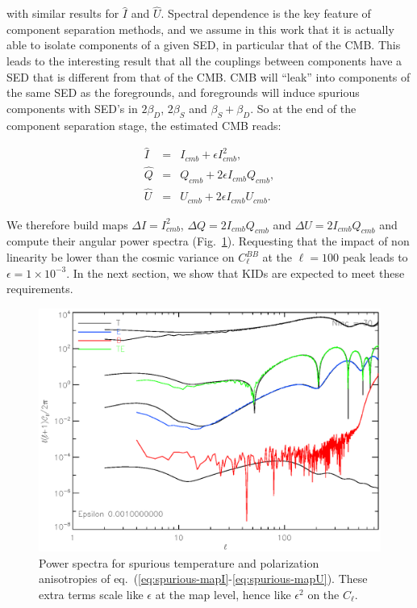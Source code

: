 \noindent with similar results for $\hat{I}$ and $\hat{U}$. Spectral dependence is the key
feature of component separation methods, and we assume in this work that it is
actually able to isolate components of a given SED, in particular that of the
CMB. This leads to the interesting result that all the couplings between
components have a SED that is different from that of the CMB. CMB will ``leak''
into components of the same SED as the foregrounds, and foregrounds will induce
spurious components with SED's in $2\beta_D$, $2\beta_S$ and
$\beta_S+\beta_D$. So at the end of the component separation stage, the
estimated CMB reads:

\begin{eqnarray}
\hat{I} &=& I_{cmb} +  \epsilon I_{cmb}^2, \label{eq:spurious-mapI}\\
\hat{Q} &=& Q_{cmb} + 2\epsilon I_{cmb}Q_{cmb}, \label{eq:spurious-mapQ}\\
\hat{U} &=& U_{cmb} + 2\epsilon I_{cmb}U_{cmb} \label{eq:spurious-mapU}.
\end{eqnarray}

We therefore build maps $\Delta I = I_{cmb}^2$, $\Delta Q = 2I_{cmb}Q_{cmb}$ and
$\Delta U = 2I_{cmb}Q_{cmb}$ and compute their angular power spectra
(Fig.~\ref{fig:fg_nl_residuals}). Requesting that the impact of non linearity be
lower than the cosmic variance on $C^{BB}_\ell$ at the $\ell=100$ peak leads to
$\epsilon = 1\times 10^{-3}$. In the next section, we show that KIDs are expected
to meet these requirements.



\begin{figure}
\center
\includegraphics[clip,angle=0,width=\columnwidth]{Figures/non_linear_fg_residuals_cl_epsilon_1d-3.eps}
\caption{Power spectra for spurious temperature and polarization anisotropies of
  eq.~(\ref{eq:spurious-mapI}-\ref{eq:spurious-mapU}). These extra terms scale
  like $\epsilon$ at the map level, hence like $\epsilon^2$ on the $C_\ell$.}
\label{fig:fg_nl_residuals}
\end{figure}


